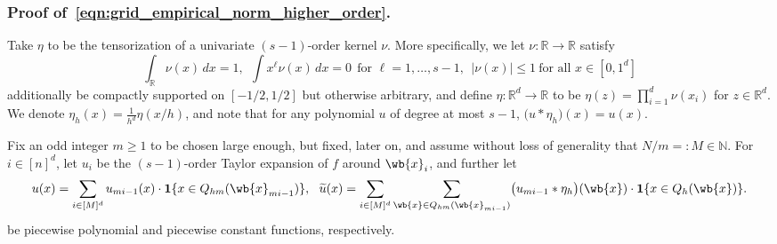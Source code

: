 \documentclass{article}
\newcommand{\Reals}{\mathbb{R}}
\newcommand{\abs}[1]{\left \lvert #1 \right \rvert}
\newcommand{\1}{\mathbf{1}}
\newcommand{\wt}[1]{\widetilde{#1}}
\theoremstyle{alden}
\theoremstyle{aldenthm}
\theoremstyle{definition}
\theoremstyle{remark}
\begin{document}
\subsubsection{Proof of~\eqref{eqn:grid_empirical_norm_higher_order}.}
\label{subsubsec:grid_empirical_norm_ho_pf}
Take $\eta$ to be the tensorization of a univariate $(s - 1)$-order kernel $\nu$. More specifically, we let $\nu: \Reals \to \Reals$ satisfy
\begin{equation*}
\int_{\Reals} \nu(x) \,dx = 1,~~ \int x^{\ell} \nu(x) \,dx = 0~~\textrm{for $\ell = 1,\ldots,s-1$},~~ \abs{\nu(x)} \leq 1~\textrm{for all $x \in [0,1^d]$}
\end{equation*}
additionally be compactly supported on $[-1/2,1/2]$ but otherwise arbitrary, and define $\eta:\Reals^d \to \Reals$ to be $\eta(z) = \prod_{i = 1}^{d} \nu(x_i)$ for $z \in \Reals^d$. We denote $\eta_h(x) = \frac{1}{h^d} \eta(x/h)$, and note that for any polynomial $u$ of degree at most $s - 1$, $\bigl(u \ast \eta_h\bigr)(x) = u(x)$. 

Fix an odd integer $m \geq 1$ to be chosen large enough, but fixed, later on, and assume without loss of generality that $N/m =: M \in \mathbb{N}$. For $i \in [n]^d$, let $u_{i}$ be the $(s - 1)$-order Taylor expansion of $f$ around $\wb{x}_i$, and further let
\begin{align*}
u(x) = \sum_{i \in [M]^d} u_{mi - 1}(x) \cdot \1\{x \in Q_{hm}(\wb{x}_{mi - 1})  \},~~ \wt{u}(x) = \sum_{i \in [M]^d} \sum_{\wb{x} \in  Q_{hm}(\wb{x}_{mi - 1})} \bigl(u_{mi - 1} \ast \eta_h\bigr)(\wb{x}) \cdot \1\{x \in Q_{h}(\wb{x})  \}.
\end{align*}
be piecewise polynomial and piecewise constant functions, respectively.
\end{document}
